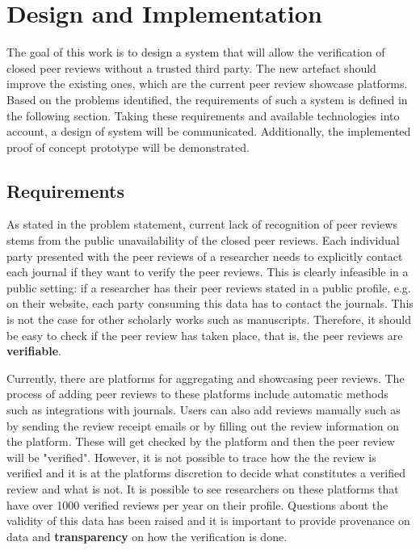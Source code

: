 
\chapter{Design and Implementation}\label{chapter:design}

The goal of this work is to design a system that will allow the verification of closed peer reviews without a trusted third party. The new artefact should improve the existing ones, which are the current peer review showcase platforms. Based on the problems identified, the requirements of such a system is defined in the following section. Taking these requirements and available technologies into account, a design of system will be communicated. Additionally, the implemented proof of concept prototype will be demonstrated.

\section{Requirements}

As stated in the problem statement, current lack of recognition of peer reviews stems from the public unavailability of the closed peer reviews. Each individual party presented with the peer reviews of a researcher needs to explicitly contact each journal if they want to verify the peer reviews. This is clearly infeasible in a public setting: if a researcher has their peer reviews stated in a public profile, e.g. on their website, each party consuming this data has to contact the journals. This is not the case for other scholarly works such as manuscripts. Therefore, it should be easy to check if the peer review has taken place, that is, the peer reviews are \textbf{verifiable}.

Currently, there are platforms for aggregating and showcasing peer reviews. The process of adding peer reviews to these platforms include automatic methods such as integrations with journals. Users can also add reviews manually such as by sending the review receipt emails or by filling out the review information on the platform. These will get checked by the platform and then the peer review will be "verified". However, it is not possible to trace how the the review is verified and it is at the platforms discretion to decide what constitutes a verified review and what is not. It is possible to see researchers on these platforms that have over 1000 verified reviews per year on their profile. Questions about the validity of this data has been raised \parencite{TeixeiradaSilva.2020, TeixeiradaSilva.2017, TeixeiradaSilva.2019} and it is important to provide provenance on data and \textbf{transparency} on how the verification is done. 

